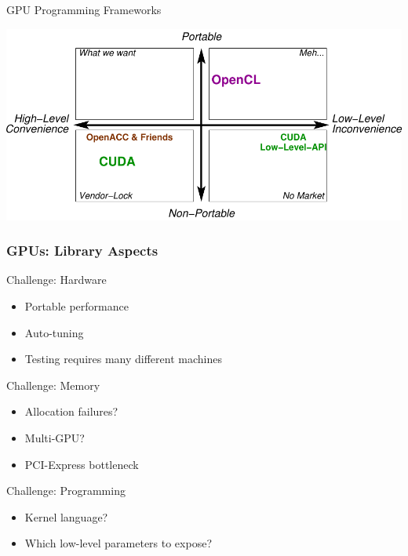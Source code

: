 \begin{frame}[fragile]{GPU Programming Frameworks}
 \begin{center}
  \includegraphics[width=\textwidth]{figures/gpu-programming-comparison-final}
 \end{center}
\end{frame}


\begin{frame}[fragile]
\frametitle{GPUs: Library Aspects}

 \begin{block}{Challenge: Hardware}
  \begin{itemize}
   \item Portable performance
   \item Auto-tuning
   \item Testing requires many different machines
  \end{itemize}
 \end{block}

 \begin{block}{Challenge: Memory}
  \begin{itemize}
   \item Allocation failures?
   \item Multi-GPU?
   \item PCI-Express bottleneck
  \end{itemize}
 \end{block}

 \begin{block}{Challenge: Programming}
  \begin{itemize}
   \item Kernel language?
   \item Which low-level parameters to expose?
  \end{itemize}
 \end{block}

\end{frame}


